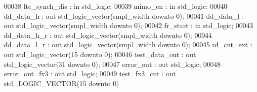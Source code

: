 \begin{DoxyCode}
00038           \textcolor{vhdlchar}{lte_synch_dis} \textcolor{vhdlchar}{:} \textcolor{keywordflow}{in} \textcolor{comment}{std\_logic};
00039           \textcolor{vhdlchar}{mimo_en}         \textcolor{vhdlchar}{:} \textcolor{keywordflow}{in} \textcolor{comment}{std\_logic};
00040           \textcolor{vhdlchar}{dd_data_h}       \textcolor{vhdlchar}{:} \textcolor{keywordflow}{out} \textcolor{comment}{std\_logic\_vector}\textcolor{vhdlchar}{(}\textcolor{vhdlchar}{smpl_width} \textcolor{keywordflow}{downto} \textcolor{vhdllogic}{}\textcolor{vhdllogic}{0}\textcolor{vhdlchar}{)};
00041           \textcolor{vhdlchar}{dd_data_l}       \textcolor{vhdlchar}{:} \textcolor{keywordflow}{out} \textcolor{comment}{std\_logic\_vector}\textcolor{vhdlchar}{(}\textcolor{vhdlchar}{smpl_width} \textcolor{keywordflow}{downto} \textcolor{vhdllogic}{}\textcolor{vhdllogic}{0}\textcolor{vhdlchar}{)};
00042           \textcolor{vhdlchar}{fr_start}        \textcolor{vhdlchar}{:} \textcolor{keywordflow}{in} \textcolor{comment}{std\_logic};
00043           \textcolor{vhdlchar}{dd_data_h_r}     \textcolor{vhdlchar}{:} \textcolor{keywordflow}{out} \textcolor{comment}{std\_logic\_vector}\textcolor{vhdlchar}{(}\textcolor{vhdlchar}{smpl_width} \textcolor{keywordflow}{downto} \textcolor{vhdllogic}{}\textcolor{vhdllogic}{0}\textcolor{vhdlchar}{)};
00044           \textcolor{vhdlchar}{dd_data_l_r}     \textcolor{vhdlchar}{:} \textcolor{keywordflow}{out} \textcolor{comment}{std\_logic\_vector}\textcolor{vhdlchar}{(}\textcolor{vhdlchar}{smpl_width} \textcolor{keywordflow}{downto} \textcolor{vhdllogic}{}\textcolor{vhdllogic}{0}\textcolor{vhdlchar}{)};
00045           \textcolor{vhdlchar}{rd_cnt_ext}        \textcolor{vhdlchar}{:} \textcolor{keywordflow}{out} \textcolor{comment}{std\_logic\_vector}\textcolor{vhdlchar}{(}\textcolor{vhdllogic}{}\textcolor{vhdllogic}{15} \textcolor{keywordflow}{downto} \textcolor{vhdllogic}{}\textcolor{vhdllogic}{0}\textcolor{vhdlchar}{)};
00046           \textcolor{vhdlchar}{test_data_out} \textcolor{vhdlchar}{:} \textcolor{keywordflow}{out} \textcolor{comment}{std\_logic\_vector}\textcolor{vhdlchar}{(}\textcolor{vhdllogic}{}\textcolor{vhdllogic}{31} \textcolor{keywordflow}{downto} \textcolor{vhdllogic}{}\textcolor{vhdllogic}{0}\textcolor{vhdlchar}{)};
00047           \textcolor{vhdlchar}{error_out}         \textcolor{vhdlchar}{:} \textcolor{keywordflow}{out} \textcolor{comment}{std\_logic};
00048           \textcolor{vhdlchar}{error_out_fx3} \textcolor{vhdlchar}{:} \textcolor{keywordflow}{out} \textcolor{comment}{std\_logic};
00049           \textcolor{vhdlchar}{test_fx3_cnt}      \textcolor{vhdlchar}{:} \textcolor{keywordflow}{out} \textcolor{comment}{std\_LOGIC\_VECTOR}\textcolor{vhdlchar}{(}\textcolor{vhdllogic}{}\textcolor{vhdllogic}{15} \textcolor{keywordflow}{downto} \textcolor{vhdllogic}{}\textcolor{vhdllogic}{0}\textcolor{vhdlchar}{)}

\end{DoxyCode}
